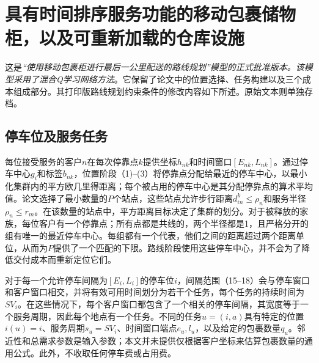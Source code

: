 \documentclass[11pt]{article}
\begin{document}
\section*{具有时间排序服务功能的移动包裹储物柜，以及可重新加载的仓库设施}
这是\emph{“使用移动包裹柜进行最后一公里配送的路线规划”模型的正式批准版本。该模型采用了混合Q学习网络方法}。它保留了论文中的位置选择、任务构建以及三个成本组成部分。其打印版路线规划约束条件的修改内容如下所述。原始文本则单独存档。

\subsection*{停车位及服务任务}
每位接受服务的客户$n$在每次停靠点$k$提供坐标$h_{nk}$和时间窗口$[E_{nk},L_{nk}]$。通过停车中心$g_i$和标签$b_{nk}$，位置阶段（1)--(3）将停靠点分配给最近的停车中心，以最小化集群内的平方欧几里得距离；每个被占用的停车中心是其分配停靠点的算术平均值。论文选择了最小数量的$P$个站点，这些站点允许步行距离$d_{in}^k\le\rho_n$和服务半径$\rho_n\le r_m$。在该数量的站点中，平方距离目标决定了集群的划分。对于被释放的家族，每位客户有一个停靠点；所有点都是共线的，两个半径都是1，且严格分开的组有唯一的最近停车中心。每组都有一个代表，他们之间的距离超过两个距离单位，从而为$P$提供了一个匹配的下限。路线阶段使用这些停车中心，并不会为了降低交付成本而重新定位它们。

对于每一个允许停车间隔为$[E_i,L_i]$的停车位$i$，间隔范围（15–18）会与停车窗口和客户窗口相交，并将有效可用时间划分为若干个任务，每个任务的持续时间为$SV_i$。在这些情况下，每个客户窗口都包含了一个相关的停车间隔，其宽度等于一个服务周期，因此每个地点有一个任务。不同的任务$u=(i,a)$具有特定的位置$i(u)=i$、服务周期$s_u=SV_i$、时间窗口端点$e_u,l_u$，以及给定的包裹数量$q_u$。邻近性和总需求参数是输入参数；本文并未提供仅根据客户坐标来估算包裹数量的通用公式。此外，不收取任何停车费或占用费。
\end{document}
